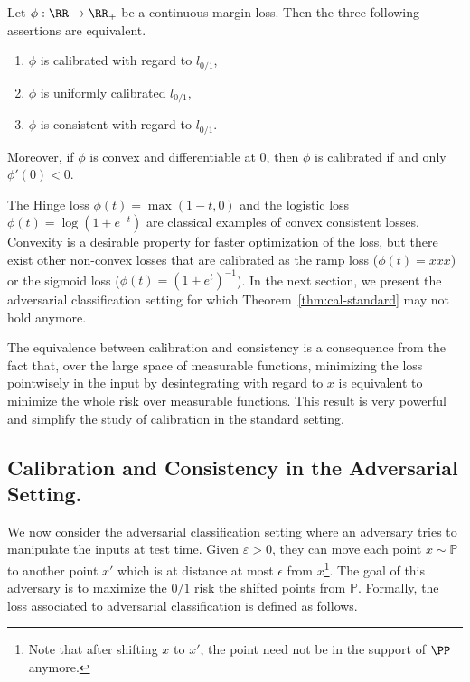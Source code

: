 \begin{thm}
\label{thm:cal-standard}
Let $\phi:\RR\to\RR_+$ be  a continuous margin loss. Then the three following assertions are equivalent.
    \begin{enumerate}
    \item $\phi$ is calibrated with regard to $l_{0/1}$,
    \item $\phi$ is uniformly calibrated $l_{0/1}$,
    \item $\phi$ is consistent with regard to $l_{0/1}$.
    \end{enumerate} 
Moreover, if $\phi$ is convex and differentiable at $0$, then $\phi$ is calibrated if and only $\phi'(0)<0$.
\end{thm}


The Hinge loss $\phi(t) = \max (1-t,0)$ and the logistic loss $\phi(t) = \log(1+e^{-t})$ are classical examples of convex consistent losses. Convexity is a desirable property for faster optimization of the loss, but there exist other non-convex losses that are calibrated as the ramp loss ($\phi(t) = xxx$) or the sigmoid loss ($\phi(t) = (1+e^t)^{-1}$). In the next section, we present the adversarial classification setting for which Theorem~\ref{thm:cal-standard} may not hold anymore. 



\begin{rmq}
The equivalence between calibration and consistency is a consequence from the fact that, over the large space of measurable functions, minimizing the loss pointwisely in the input by desintegrating with regard to $x$ is equivalent to minimize the whole risk over measurable functions. This result is very powerful and simplify the study of calibration in the standard setting. 
\end{rmq}



\subsection{Calibration and Consistency in the Adversarial Setting.}


We now consider the adversarial classification setting where an adversary tries to manipulate the inputs at test time. Given  $\varepsilon>0$, they can move each point $x \sim \mathbb{P}$ to another point $x'$ which is at distance at most $\epsilon$ from $x$\footnote{Note that after shifting $x$ to $x'$, the point need not be in the support of $\PP$ anymore.}. The goal of this adversary is to maximize the $0/1$ risk the shifted points from $\mathbb{P}$. Formally, the loss associated to adversarial classification is defined as follows.

